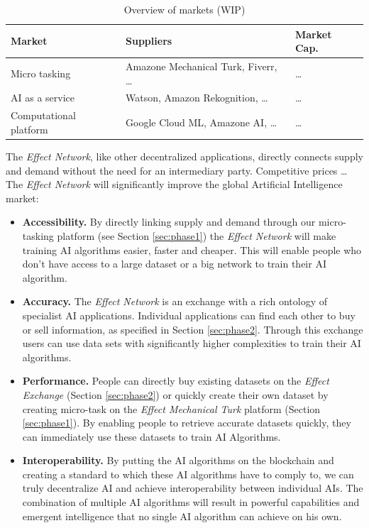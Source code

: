 \documentclass{article}
\begin{document}
\begin{table}
  \centering
  \begin{tabular}[h]{l|l|l}
    \textbf{Market} & \textbf{Suppliers} & \textbf{Market Cap.} \\ \hline
    Micro tasking & Amazone Mechanical Turk, Fiverr, \dots & \dots \\ 
    AI as a service & Watson, Amazon Rekognition, \dots & \dots \\
    Computational platform & Google Cloud ML, Amazone AI, \dots & \dots 
  \end{tabular}
  \caption{Overview of markets (WIP)}\label{tab:service_compare}
\end{table}

The \emph{Effect Network}, like other decentralized applications,
directly connects supply and demand without the need for an
intermediary party. Competitive prices \dots\\

The \emph{Effect Network} will significantly improve the global Artificial Intelligence market:
\begin{itemize}
    \item \textbf{Accessibility.} By directly linking supply and demand through our micro-tasking platform (see Section \ref{sec:phase1}) the \emph{Effect Network} will make training AI algorithms easier, faster and cheaper. This will enable people who don't have access to a large dataset or a big network to train their AI algorithm.
    \item \textbf{Accuracy.} The \emph{Effect Network} is an exchange with a rich ontology of specialist AI applications. Individual applications can find each 
  other to buy or sell information, as specified in Section \ref{sec:phase2}. Through this exchange users can use data sets with significantly higher complexities to train their AI algorithms.
    \item \textbf{Performance.} People can directly buy existing datasets on the \emph{Effect Exchange} (Section \ref{sec:phase2}) or quickly create their own dataset by creating micro-task on the \emph{Effect Mechanical Turk} platform (Section \ref{sec:phase1}). By enabling people to retrieve accurate datasets quickly, they can immediately use these datasets to train AI Algorithms.
    \item \textbf{Interoperability.} By putting the AI algorithms on the blockchain and creating a standard to which these AI algorithms have to comply to, we can truly decentralize AI and achieve interoperability between individual AIs. The combination of multiple AI algorithms will result in powerful capabilities and emergent intelligence that no single AI algorithm can achieve on his own. 
\end{itemize}
\end{document}
